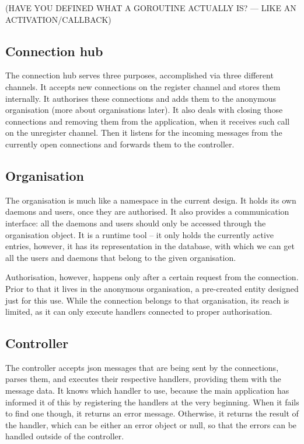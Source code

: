 \documentclass{l3proj}
\begin{document}
(HAVE YOU DEFINED WHAT A GOROUTINE ACTUALLY IS? --- LIKE AN ACTIVATION/CALLBACK)

\subsection{Connection hub}

The connection hub serves three purposes, accomplished via three different channels. It accepts new connections on the register channel and stores them internally. It authorises these connections and adds them to the anonymous organisation (more about organisations later). It also deals with closing those connections and removing them from the application, when it receives such call on the unregister channel. Then it listens for the incoming messages from the currently open connections and forwards them to the controller. 

\subsection{Organisation}

The organisation is much like a namespace in the current design. It holds its own daemons and users, once they are authorised. It also provides a communication interface: all the daemons and users should only be accessed through the organisation object. It is a runtime tool – it only holds the currently active entries, however, it has its representation in the database, with which we can get all the users and daemons that belong to the given organisation. 

Authorisation, however, happens only after a certain request from the connection. Prior to that it lives in the anonymous organisation, a pre-created entity designed just for this use. While the connection belongs to that organisation, its reach is limited, as it can only execute handlers connected to proper authorisation.

\subsection{Controller}

The controller accepts json messages that are being sent by the connections, parses them, and executes their respective handlers, providing them with the message data. It knows which handler to use, because the main application has informed it of this by registering the handlers at the very beginning. When it fails to find one though, it returns an error message. Otherwise, it returns the result of the handler, which can be either an error object or null, so that the errors can be handled outside of the controller.
\end{document}
